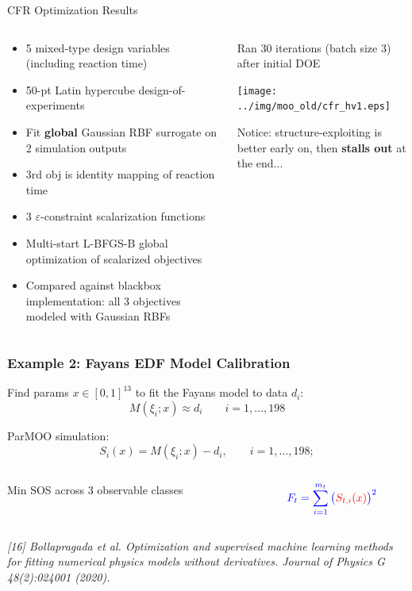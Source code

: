 \documentclass[aspectratio=169]{beamer}
\begin{document}
\begin{frame}{CFR Optimization Results}

\begin{columns}
\begin{column}{0.55\textwidth}
\begin{itemize}
\item 5 mixed-type design variables (including reaction time)
\item 50-pt Latin hypercube design-of-experiments
\item Fit {\bf global} Gaussian RBF surrogate on 2 simulation outputs
\item {\color{blue}3rd obj is identity mapping of reaction time}
\item 3 $\varepsilon$-constraint scalarization functions
\item Multi-start L-BFGS-B global optimization of scalarized objectives
\item {\color{red}Compared against blackbox implementation: all 3 objectives
modeled with Gaussian RBFs}
\end{itemize}
\end{column}
\begin{column}{0.45\textwidth}
Ran 30 iterations (batch size 3) after initial DOE\\

\bigskip

\texttt{[image: ../img/moo\_old/cfr\_hv1.eps]}\\

\bigskip

Notice: structure-exploiting is better early on, then
{\bf stalls out} at the end...

\end{column}
\end{columns}
\end{frame}

\begin{frame}\frametitle{Example 2: Fayans EDF Model Calibration}
Find params $x \in [0, 1]^{13}$ to fit the Fayans model to data $d_i$:
$$
M\left(\xi_{i};x\right) \approx d_{i} \qquad i=1,\ldots, 198
$$

\medskip

ParMOO simulation:
$$
S_{i}(x) = M\left(\xi_{i};x\right) - d_{i},
\qquad i=1,\ldots, 198;
$$

\medskip

\begin{columns}
\begin{column}{0.65\textwidth}
Min SOS across 3 observable classes
\end{column}
\begin{column}{0.35\textwidth}
$$
{\color{blue}F_t = \sum_{i=1}^{m_t}\big({\color{red}S_{t,i}(x)}\big)^2}
$$
\end{column}
\end{columns}

\vfill

{\tiny\it
[16] Bollapragada et al.
Optimization and supervised machine learning methods for fitting numerical physics models without derivatives.
Journal of Physics G 48(2):024001 (2020).\\}
\end{frame}
\end{document}
